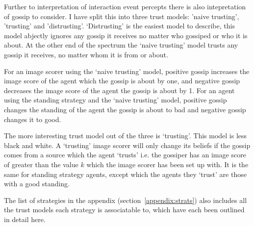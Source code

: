 \documentclass[]{final_report}
\begin{document}
Further to interpretation of interaction event percepts there is also intepretation of gossip to consider. I have split this into three trust models: 'naive trusting', 'trusting' and 'distrusting'. `Distrusting' is the easiest model to describe, this model abjectly ignores any gossip it receives no matter who gossiped or who it is about. At the other end of the spectrum the `naive trusting' model trusts any gossip it receives, no matter whom it is from or about.\par
For an image scorer using the `naive trusting' model, positive gossip increases the image score of the agent which the gossip is about by one, and negative gossip decreases the image score of the agent the gossip is about by 1. For an agent using the standing strategy and the `naive trusting' model, positive gossip changes the standing of the agent the gossip is about to bad and negative gossip changes it to good.\par
The more interesting trust model out of the three is `trusting'. This model is less black and white. A `trusting' image scorer will only change its beliefs if the gossip comes from a source which the agent `trusts' i.e. the gossiper has an image score of greater than the value $k$ which the image scorer has been set up with. It is the same for standing strategy agents, except which the agents they `trust' are those with a good standing.\par
The list of strategies in the appendix (section~\ref{appendix:strats}) also includes all the trust models each strategy is associatable to, which have each been outlined in detail here. 
\end{document}
